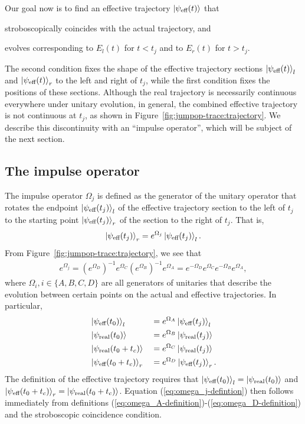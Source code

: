 Our goal now is to find an effective trajectory $\ket{\psi_{\text{eff}}(t)}$ that 
\begin{enumerate*}[label=(\alph*)]
	\item stroboscopically coincides with the actual trajectory, and
	\item evolves corresponding to $E_l(t)$ for $t<t_j$ and to $E_r(t)$ for $t>t_j$.
\end{enumerate*} 
The second condition fixes the shape of the effective trajectory sections $\ket{\psi_{\text{eff}}(t)}_l $ and $\ket{\psi_{\text{eff}}(t)}_r$ to the left and right of $t_j$, while the first condition fixes the positions of these sections. Although the real trajectory is necessarily continuous everywhere under unitary evolution, in general, the combined effective trajectory is not continuous at $t_j$, as shown in Figure~\ref{fig:jumpop-trace:trajectory}. We describe this discontinuity with an ``impulse operator'', which will be subject of the next section.

\subsection{The impulse operator}
\newcommand{\evolexp}[1]{e^{#1}}
The impulse operator $\Omega_j$ is defined as the generator of the unitary operator that rotates the endpoint $\ket{\psi_{\text{eff}}(t_j)}_l$ of the effective trajectory section to the left of $t_j$ to the starting point $\ket{\psi_{\text{eff}}(t_j)}_r$ of the section to the right of $t_j$. That is,
\begin{align}
	\ket{\psi_{\eff}(t_j)}_r = \evolexp{\Omega_j} \ket{\psi_{\eff}(t_j)}_l.
\end{align}
From Figure~\ref{fig:jumpop-trace:trajectory}, we see that
\begin{align}
	\evolexp{\Omega_j} = (\evolexp{\Omega_D})^{-1} \evolexp{\Omega_C} (\evolexp{\Omega_B})^{-1} \evolexp{\Omega_A} = \evolexp{-\Omega_D} \evolexp{\Omega_C} \evolexp{-\Omega_B} \evolexp{\Omega_A},
	\label{eq:omega_j-defintion}
\end{align}
where $\Omega_i, i \in \{A,B,C,D\}$ are all generators of unitaries that describe the evolution between certain points on the actual and effective trajectories. In particular,
\begin{alignat}{2}
	&\ket{\psi_\eff(t_0)}_l &&= \evolexp{\Omega_A} \ket{\psi_\eff(t_j)}_l \label{eq:omega_A-definition} \\
	&\ket{\psi_\real(t_0)} &&= \evolexp{\Omega_B} \ket{\psi_\real(t_j)} \label{eq:omega_B-definition} \\
	&\ket{\psi_\real(t_0+t_c)} &&= \evolexp{\Omega_C} \ket{\psi_\real(t_j)} \label{eq:omega_C-definition} \\
	&\ket{\psi_\eff(t_0+t_c)}_r &&= \evolexp{\Omega_D} \ket{\psi_\eff(t_j)}_r. \label{eq:omega_D-definition}
\end{alignat}
The definition of the effective trajectory requires that $\ket{\psi_{\text{eff}}(t_0)}_l = \ket{\psi_{\text{real}}(t_0)}$ and $\ket{\psi_{\text{eff}}(t_0+t_c)}_r = \ket{\psi_{\text{real}}(t_0+t_c)}$. Equation (\ref{eq:omega_j-defintion}) then follows immediately from definitions (\ref{eq:omega_A-definition})-(\ref{eq:omega_D-definition}) and the stroboscopic coincidence condition.

